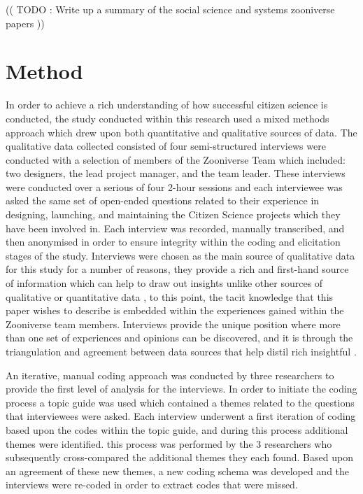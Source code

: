 \documentclass{sigchi}
\begin{document}
(( TODO : Write up a summary of the social science and systems zooniverse papers ))

\section{Method}

In order to achieve a rich understanding of how successful citizen science is conducted, the study conducted within this research used a mixed methods approach which drew upon both quantitative and qualitative sources of data. The qualitative data collected consisted of four semi-structured interviews were conducted with a selection of members of the Zooniverse Team which included: two designers, the lead project manager, and the team leader. These interviews were conducted over a serious of four 2-hour sessions and each interviewee was asked the same set of open-ended questions related to their experience in designing, launching, and maintaining the Citizen Science projects which they have been involved in. Each interview was recorded, manually transcribed, and then anonymised in order to ensure integrity within the coding and elicitation stages of the study. Interviews were chosen as the main source of qualitative data for this study for a number of reasons, they provide a rich and first-hand source of information which can help to draw out insights unlike other sources of qualitative or quantitative data \cite{Yin2003}, to this point, the tacit knowledge that this paper wishes to describe is embedded within the experiences gained within the Zooniverse team members. Interviews provide the unique position where more than one set of experiences and opinions can be discovered, and it is through the triangulation and agreement between data sources that help distil rich insightful \cite{Denzin1978} \cite{Morse1994}.


An iterative, manual coding approach was conducted by three researchers to provide the first level of analysis for the interviews. In order to initiate the coding process a topic guide was used which contained a themes related to the questions that interviewees were asked. Each interview underwent a first iteration of coding based upon the codes within the topic guide, and during this process additional themes were identified. this process was performed by 
the 3 researchers who subsequently cross-compared the additional themes they each found. Based upon an agreement of these new themes, a new coding schema was developed and the interviews were re-coded in order to extract codes that were missed. 
\end{document}
